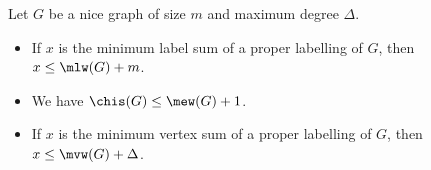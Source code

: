 \documentclass[a4paper,11pt,dvipsnames]{elsarticle}
\newcommand{\commenttext}[1]{ \begin{center} {\fbox{\begin{minipage}[h]{0.9 \linewidth}   {\textsf{ #1}} \end{minipage} }} \end{center}}
\newcommand{\Sam}[1]{{\color{red}\commenttext{Sam : #1}}}
\newcommand{\sam}[1]{\todo[size=\tiny,color=red!20!white]{\textbf{Sam:} #1}}
\newcommand{\Sam}[1]{}
\newcommand{\sam}[1]{}
\begin{document}
\begin{observation}\label{observation:connections-with-labellings}
Let $G$ be a nice graph of size $m$ and maximum degree $\Delta$.
\begin{itemize}
	\item If $x$ is the minimum label sum of a proper labelling of $G$,
	then $x \leq \mlw(G)+m$.%
	\item We have $\chis(G) \leq \mew(G)+1$.
	\item If $x$ is the minimum vertex sum of a proper labelling of $G$,
	then $x \leq \mvw(G)+\Delta$.
\end{itemize}
\end{observation}
\end{document}
